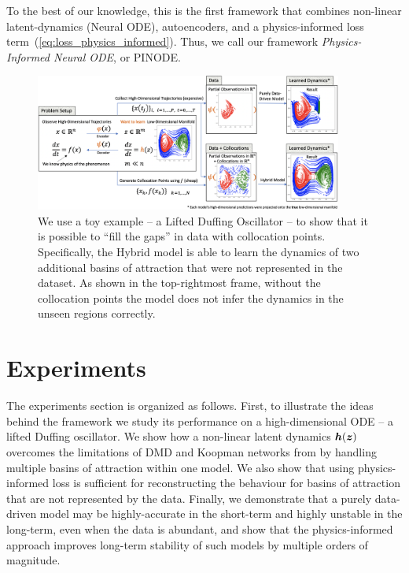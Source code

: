 To the best of our knowledge, this is the first framework that combines non-linear latent-dynamics (Neural ODE), autoencoders, and a physics-informed loss term~(\ref{eq:loss_physics_informed}). Thus, we call our framework \textit{Physics-Informed Neural ODE}, or PINODE. 
\begin{figure}[t]
    \centering
    \includegraphics[width=0.9\textwidth]{figures/duff_first_exp_abstract.png}
    \caption{We use a toy example -- a Lifted Duffing Oscillator -- to show that it is possible to ``fill the gaps'' in data with collocation points. Specifically, the Hybrid model is able to learn the dynamics of two additional basins of attraction that were not represented in the dataset. As shown in the top-rightmost frame, without the collocation points the model does not infer the dynamics in the unseen regions correctly.}
    \label{fig:duffing_pinode}
\end{figure}

\section{Experiments}
\label{sec:exp}
The experiments section is organized as follows. First, to illustrate the ideas behind the framework we study its performance on a high-dimensional ODE -- a lifted Duffing oscillator. We show how a non-linear latent dynamics $\boldsymbol{h}(\boldsymbol{z})$ overcomes the limitations of DMD and Koopman networks from \cite{liu2022physics} by handling multiple basins of attraction within one model. We also show that using physics-informed loss is sufficient for reconstructing the behaviour for basins of attraction that are not represented by the data. Finally, we demonstrate that a purely data-driven model may be highly-accurate in the short-term and highly unstable in the long-term, even when the data is abundant, and show that the physics-informed approach improves long-term stability of such models by multiple orders of magnitude.

